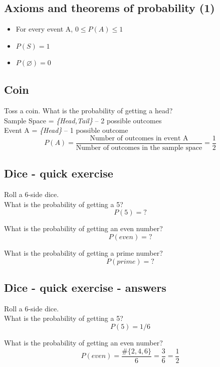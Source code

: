 \documentclass[11pt]{article}
\let\emptyset\varnothing
\begin{document}
	\subsection*{Axioms and theorems of probability (1)}
	\begin{itemize}
		\item For every event A, $0 \leq P(A) \leq 1$
		\item $P(S) = 1$
		\item $P(\emptyset) = 0$
	\end{itemize}


	\subsection*{Coin}
	Toss a coin. What is the probability of getting a head?\\
	
	Sample Space = \emph{\{Head,Tail\}} -- 2 possible outcomes\\
	
	Event A = \emph{\{Head\}} -- 1 possible outcome\\
	
	\[P(A) = \frac{\text{Number of outcomes in event A}}
	{\text{Number of outcomes in the sample space}} = \frac{1}{2}\]


	\subsection*{Dice - quick exercise}
	Roll a 6-side dice.\\
	
	What is the probability of getting a 5?\\
	\[P(5) = ?	\]
	
	What is the probability of getting an even number?\\
	\[P(even) = ?	\]
	
	What is the probability of getting a prime number?\\
	\[P(prime) = ?	\]


	\subsection*{Dice - quick exercise - answers}

	Roll a 6-side dice.\\
	
	What is the probability of getting a 5?\\
	\[P(5) = 1/6	\]
	
	What is the probability of getting an even number?\\
	\[P(even) = \frac{\#\{2, 4, 6\}}{6} = \frac{3}{6} = \frac{1}{2}	\]
		
\end{document}
